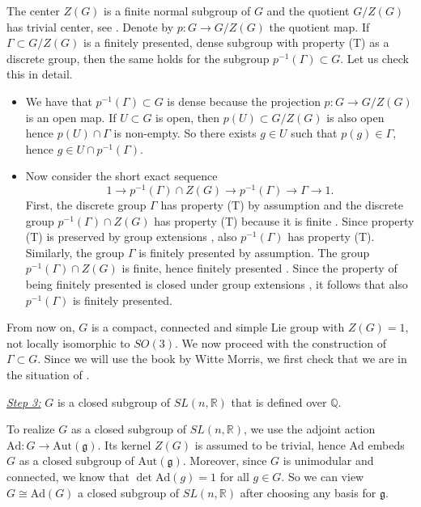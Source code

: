 \documentclass[11pt, letterpaper, oneside,reqno]{amsart}
\theoremstyle{plain}
\theoremstyle{underline}
\theoremstyle{definition}
\theoremstyle{remark}
\begin{document}
	The center $Z(G)$ is a finite normal subgroup of $G$ and the quotient $G/Z(G)$ has trivial center, see \cite[Ex.~7.11(b)]{Fulton}. Denote by $p:G\rightarrow G/Z(G)$ the quotient map. If $\Gamma\subset G/Z(G)$ is a finitely presented, dense subgroup with property (T) as a discrete group, then the same holds for the subgroup $p^{-1}(\Gamma)\subset G$. Let us check this in detail.
	\begin{itemize}
		\item We have that $p^{-1}(\Gamma)\subset G$ is dense because the projection $p:G\rightarrow G/Z(G)$ is an open map. If $U\subset G$ is open, then $p(U)\subset G/Z(G)$ is also open hence $p(U)\cap\Gamma$ is non-empty. So there exists $g\in U$ such that $p(g)\in\Gamma$, hence $g\in U\cap p^{-1}(\Gamma)$.
		\item Now consider the short exact sequence
		\[
		1\rightarrow p^{-1}(\Gamma)\cap Z(G)\rightarrow p^{-1}(\Gamma)\rightarrow \Gamma\rightarrow 1.
		\]
		First, the discrete group $\Gamma$ has property (T) by assumption and the discrete group $p^{-1}(\Gamma)\cap Z(G)$ has property (T) because it is finite \cite[Prop.~1.1.5]{Kazhdan}. Since property (T) is preserved by group extensions \cite[Prop.~1.7.6]{Kazhdan}, also $p^{-1}(\Gamma)$ has property (T). Similarly, the group $\Gamma$ is finitely presented by assumption. The group $p^{-1}(\Gamma)\cap Z(G)$ is finite, hence finitely presented \cite[Chapter~4, Prop.~1]{groups}. Since the property of being finitely presented is closed under group extensions \cite[Chapter~10, Cor.~2]{groups}, it follows that also $p^{-1}(\Gamma)$ is finitely presented.
	\end{itemize}
	From now on, $G$ is a compact, connected and simple Lie group with $Z(G)=1$, not locally isomorphic to $SO(3)$. We now proceed with the construction of $\Gamma\subset G$. Since we will use the book \cite{Witte} by Witte Morris, we first check that we are in the situation of \cite[Def.~5.1.2]{Witte}.
	
	\vspace{0.2cm}
	\underline{\emph{Step 3:}} $G$ is a closed subgroup of $SL(n,\mathbb{R})$ that is defined over $\mathbb{Q}$.
	
	To realize $G$ as a closed subgroup of $SL(n,\mathbb{R})$, we use the adjoint action $\text{Ad}:G\rightarrow\text{Aut}(\mathfrak{g})$. Its kernel $Z(G)$ is assumed to be trivial, hence $\text{Ad}$ embeds $G$ as a closed subgroup of $\text{Aut}(\mathfrak{g})$. Moreover, since $G$ is unimodular and connected, we know that $\det\text{Ad}(g)=1$ for all $g\in G$.  So we can view $G\cong\text{Ad}(G)$ a closed subgroup of $SL(n,\mathbb{R})$ after choosing any basis for $\mathfrak{g}$. 
	
\end{document}
